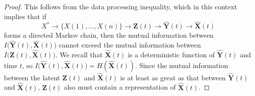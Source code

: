 \documentclass[12pt]{article}
\begin{document}
\begin{proof}
	This follows from the data processing inequality, which in this context implies that if 
	\begin{equation}
		X^* \to \{X(1), \dots, X(n)\} \to \mathbf{Z}(t) \to \hat{\mathbf{Y}}(t) \to \hat{\mathbf X}(t) 
	\end{equation}
	forms a directed Markov chain, then the mutual information between $I\big(\hat{\mathbf Y}(t), \hat{\mathbf X}(t)\big)$ cannot exceed the mutual information between $I\big(\mathbf Z(t), \hat{\mathbf X}(t)\big)$.
	We recall that $\hat{\mathbf X}(t)$ is a deterministic function of $\hat{\mathbf Y}(t)$ and time $t$, so $I\big(\hat{\mathbf Y}(t), \hat{\mathbf X}(t)\big) = H(\hat{\mathbf X}(t))$. 
	Since the mutual information between the latent $\mathbf Z(t)$ and $\hat{\mathbf X}(t)$ is at least as great as that between $\hat{\mathbf Y}(t)$ and $\hat{\mathbf X}(t)$, $\mathbf Z(t)$ also must contain a representation of $\hat{\mathbf X}(t)$. 
\end{proof}
\end{document}

